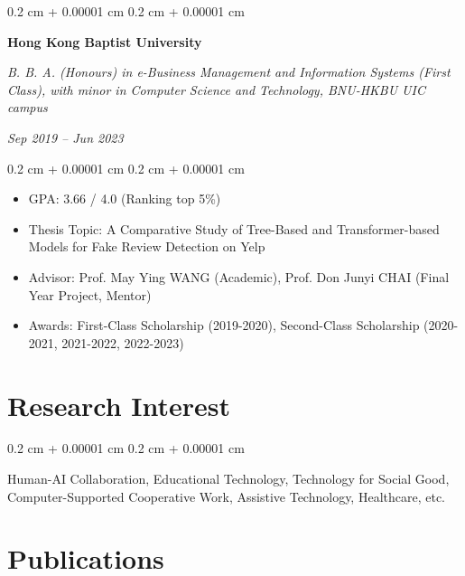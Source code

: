 \documentclass[10pt, letterpaper]{article}
\newenvironment{highlights}{
    \begin{itemize}[
        topsep=0.10 cm,
        parsep=0.10 cm,
        partopsep=0pt,
        itemsep=0pt,
        leftmargin=0.4 cm + 10pt
    ]
}{
    \end{itemize}
} %
\newenvironment{onecolentry}{
    \begin{adjustwidth}{
        0.2 cm + 0.00001 cm
    }{
        0.2 cm + 0.00001 cm
    }
}{
    \end{adjustwidth}
} %
\newenvironment{twocolentry}[2][]{
    \onecolentry
    \def\secondColumn{#2}
    \setcolumnwidth{\fill, 4.5 cm}
    \begin{paracol}{2}
}{
    \switchcolumn \raggedleft \secondColumn
    \end{paracol}
    \endonecolentry
} %
\begin{document}
        \vspace{0.2 cm}

        \begin{twocolentry}{
        \textit{Sep 2019 – Jun 2023}}
            \textbf{Hong Kong Baptist University}

            \textit{B. B. A. (Honours) in e-Business Management and Information Systems (First Class), with minor in Computer Science and Technology, BNU-HKBU UIC campus}
        \end{twocolentry}

        \vspace{0.10 cm}
        \begin{onecolentry}
            \begin{highlights}
                \item GPA: 3.66 / 4.0 (Ranking top 5\%)
                \item Thesis Topic: A Comparative Study of Tree-Based and Transformer-based Models for Fake Review Detection on Yelp
                \item Advisor: Prof. May Ying WANG (Academic), Prof. Don Junyi CHAI (Final Year Project, Mentor)
                \item Awards: First-Class Scholarship (2019-2020), Second-Class Scholarship (2020-2021, 2021-2022, 2022-2023)
            \end{highlights}
        \end{onecolentry}

    \section{Research Interest}

        \begin{onecolentry}
            Human-AI Collaboration, Educational Technology, Technology for Social Good, Computer-Supported Cooperative Work, Assistive Technology, Healthcare, etc.
        \end{onecolentry}

    \section{Publications}
\end{document}
